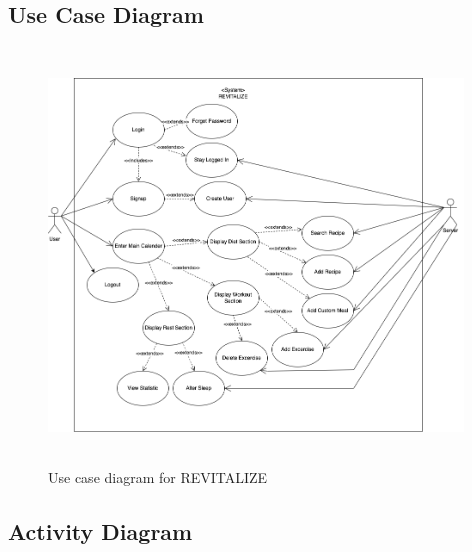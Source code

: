 \documentclass[12pt,letterpaper]{article}
\begin{document}
\subsection{Use Case Diagram}
\begin{figure}[H]
\centering
\includegraphics[width=11cm, height=11cm]{4G06SRSUseCaseDiagram.png}
\caption{Use case diagram for REVITALIZE}
\end{figure}

\subsection{Activity Diagram}
\end{document}
